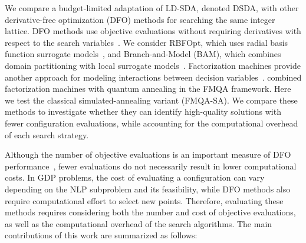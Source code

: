 \documentclass{article}
\begin{document}
We compare a budget-limited adaptation of LD-SDA, denoted DSDA, with other derivative-free optimization (DFO) methods for searching the same integer lattice. 
DFO methods use objective evaluations without requiring derivatives with respect to the search variables~\cite{larson2019derivative}. 
We consider RBFOpt, which uses radial basis function surrogate models~\cite{costa2018rbfopt}, and Branch-and-Model (BAM), which combines domain partitioning with local surrogate models~\cite{ma2023bam}. 
Factorization machines provide another approach for modeling interactions between decision variables~\cite{rendle2010factorization}. 
\textcite{kitai2020designing} combined factorization machines
with quantum annealing in the FMQA framework.
Here we test the classical simulated-annealing variant (FMQA-SA).
We compare these methods to investigate whether they can identify high-quality solutions with fewer configuration evaluations, while accounting for the computational overhead of each search strategy.

Although the number of objective evaluations is an important measure of DFO performance~\cite{more2009benchmarking}, fewer evaluations do not necessarily result in lower computational costs. 
In GDP problems, the cost of evaluating a configuration can vary depending on the NLP subproblem and its feasibility, while DFO methods also require computational effort to select new points. 
Therefore, evaluating these methods requires considering both the number and cost of objective evaluations, as well as the computational overhead of the search algorithms.
The main contributions of this work are summarized as follows:
\end{document}
